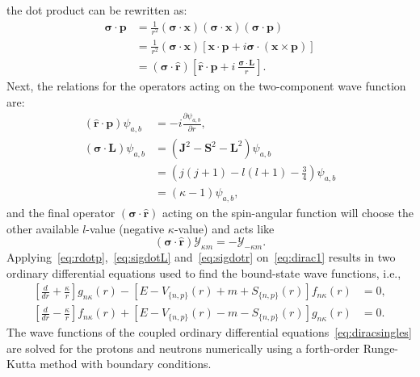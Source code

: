 the dot product can be rewritten as:
\begin{align}
\boldsymbol{\sigma}\cdot\mathbf{p} &= \frac{1}{r^2}(\boldsymbol{\sigma}\cdot \mathbf{x})(\boldsymbol{\sigma}\cdot \mathbf{x})(\boldsymbol{\sigma}\cdot \mathbf{p}) \nonumber 
\\
&= \frac{1}{r^2}(\boldsymbol{\sigma}\cdot \mathbf{x}) \left[ \mathbf{x\cdot p} + i \boldsymbol{\sigma}\cdot (\mathbf{x}\times\mathbf{p}) \right] \nonumber 
\\
&= (\boldsymbol{\sigma}\cdot\mathbf{\hat{r}}) \left[ \mathbf{\hat{r}\cdot p} + i\ \frac{\boldsymbol{\sigma}\cdot\mathbf{L}}{r} \right].
\end{align}
Next, the relations for the operators acting on the two-component wave function are:
\begin{align}
(\mathbf{\hat{r}\cdot p})\psi _{a,b} &= -i\frac{\partial \psi _{a,b}}{\partial r},\label{eq:rdotp}
\\[2ex]
(\boldsymbol{\sigma}\cdot\mathbf{L})\psi _{a,b} &= (\mathbf{J}^2-\mathbf{S}^2-\mathbf{L}^2)\psi _{a,b} \nonumber \\
&= \left( j(j+1)-l(l+1)-\frac{3}{4} \right) \psi _{a,b} \nonumber \\
&= (\kappa - 1)\psi _{a,b}, \label{eq:sigdotL}
\end{align}
and the final operator $(\boldsymbol{\sigma}\cdot\mathbf{\hat{r}})$ acting on the spin-angular function will choose the other available $l$-value (negative $\kappa$-value) and acts like
\begin{equation}\label{eq:sigdotr}
(\boldsymbol{\sigma}\cdot\mathbf{\hat{r}})\mathcal{Y}_{\kappa m}=-\mathcal{Y}_{-\kappa m}.
\end{equation}
Applying~\eqref{eq:rdotp},~\eqref{eq:sigdotL} and~\eqref{eq:sigdotr} on~\eqref{eq:dirac1} results in two ordinary differential equations used to find the bound-state wave functions, i.e.,
\begin{equation}\label{eq:diracsingles}
\begin{aligned}
\left[ \frac{d}{dr}+\frac{\kappa}{r}\right] g_{n\kappa}(r) - \left[ E-V_{\lbrace n,p\rbrace}(r)+m+S_{\lbrace n,p\rbrace}(r)\right] f_{n\kappa}(r) &= 0,
\\
\left[ \frac{d}{dr}-\frac{\kappa}{r}\right] f_{n\kappa}(r) +\left[ E-V_{\lbrace n,p\rbrace}(r)-m-S_{\lbrace n,p\rbrace}(r)\right] g_{n\kappa}(r) &= 0.
\end{aligned} 
\end{equation}
The wave functions of the coupled ordinary differential equations~\eqref{eq:diracsingles} are solved for the protons and neutrons numerically using a forth-order Runge-Kutta method with boundary conditions. 

